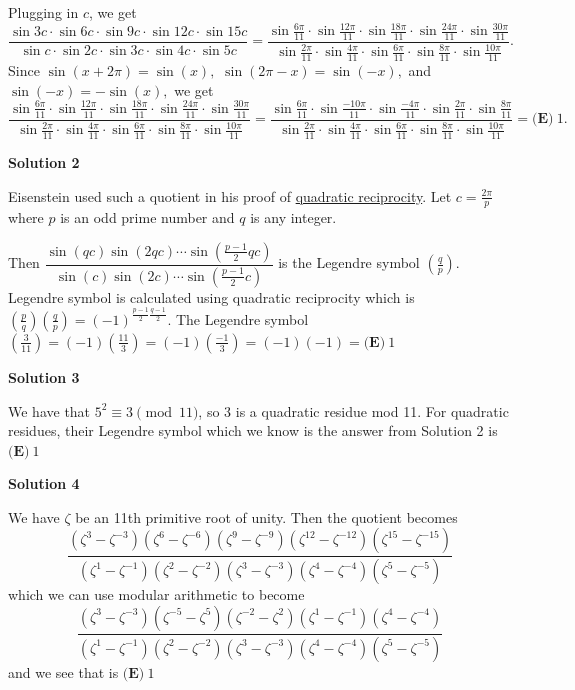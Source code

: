 \begin{enumerate}
Plugging in $c$, we get
 \[\frac{\sin 3c \cdot \sin 6c \cdot \sin 9c \cdot \sin 12c \cdot \sin 15c}{\sin c \cdot \sin 2c \cdot \sin 3c \cdot \sin 4c \cdot \sin 5c}=\frac{\sin \frac{6\pi}{11} \cdot \sin \frac{12\pi}{11} \cdot \sin \frac{18\pi}{11} \cdot \sin \frac{24\pi}{11} \cdot \sin \frac{30\pi}{11}}{\sin \frac{2\pi}{11} \cdot \sin \frac{4\pi}{11} \cdot \sin \frac{6\pi}{11} \cdot \sin \frac{8\pi}{11} \cdot \sin \frac{10\pi}{11}}.\]Since $\sin(x+2\pi)=\sin(x),$ $\sin(2\pi-x)=\sin(-x),$ and $\sin(-x)=-\sin(x),$ we get
 \[\frac{\sin \frac{6\pi}{11} \cdot \sin \frac{12\pi}{11} \cdot \sin \frac{18\pi}{11} \cdot \sin \frac{24\pi}{11} \cdot \sin \frac{30\pi}{11}}{\sin \frac{2\pi}{11} \cdot \sin \frac{4\pi}{11} \cdot \sin \frac{6\pi}{11} \cdot \sin \frac{8\pi}{11} \cdot \sin \frac{10\pi}{11}}=\frac{\sin \frac{6\pi}{11} \cdot \sin \frac{-10\pi}{11} \cdot \sin \frac{-4\pi}{11} \cdot \sin \frac{2\pi}{11} \cdot \sin \frac{8\pi}{11}}{\sin \frac{2\pi}{11} \cdot \sin \frac{4\pi}{11} \cdot \sin \frac{6\pi}{11} \cdot \sin \frac{8\pi}{11} \cdot \sin \frac{10\pi}{11}}=\boxed{\textbf{(E)}\ 1}.\]




\textbf{Solution 2}

Eisenstein used such a quotient in his proof of \href{https://artofproblemsolving.com/wiki/index.php?title=Quadratic\_reciprocity}{quadratic reciprocity}. Let $c=\frac{2\pi}{p}$ where $p$ is an odd prime number and $q$ is any integer.

 Then $\dfrac{\sin(qc)\sin(2qc)\cdots\sin(\frac{p-1}{2}qc)}{\sin(c)\sin(2c)\cdots\sin(\frac{p-1}{2}c)}$ is the Legendre symbol $\left(\frac{q}{p}\right)$. Legendre symbol is calculated using quadratic reciprocity which is $\left(\frac{p}{q}\right)\left(\frac{q}{p}\right)=(-1)^{\frac{p-1}{2}\frac{q-1}{2}}$. The Legendre symbol $\left(\frac{3}{11}\right)=(-1)\left(\frac{11}{3}\right)=(-1)\left(\frac{-1}{3}\right)=(-1)(-1)=\boxed{\textbf{(E)}\ 1}$




\textbf{Solution 3}

We have that $5^2 \equiv 3 \pmod{11}$, so 3 is a quadratic residue mod 11. For quadratic residues, their Legendre symbol which we know is the answer from Solution 2 is $\boxed{\textbf{(E)}\ 1}$




\textbf{Solution 4}

We have $\zeta$ be an 11th primitive root of unity. Then the quotient becomes 
 \[\frac{(\zeta^3-\zeta^{-3})(\zeta^6-\zeta^{-6})(\zeta^9-\zeta^{-9})(\zeta^{12}-\zeta^{-12})(\zeta^{15}-\zeta^{-15})}{(\zeta^1-\zeta^{-1})(\zeta^2-\zeta^{-2})(\zeta^3-\zeta^{-3})(\zeta^{4}-\zeta^{-4})(\zeta^{5}-\zeta^{-5})}\] which we can use modular arithmetic to become 
 \[\frac{(\zeta^3-\zeta^{-3})(\zeta^{-5}-\zeta^{5})(\zeta^{-2}-\zeta^{2})(\zeta^{1}-\zeta^{-1})(\zeta^{4}-\zeta^{-4})}{(\zeta^1-\zeta^{-1})(\zeta^2-\zeta^{-2})(\zeta^3-\zeta^{-3})(\zeta^{4}-\zeta^{-4})(\zeta^{5}-\zeta^{-5})}\] and we see that is $\boxed{\textbf{(E)}\ 1}$





\end{enumerate}

